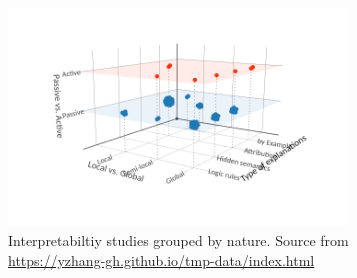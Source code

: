 \begin{figure}[H]
    \centering
    \includegraphics[width=0.8\textwidth]{fig/rel/images/ZhangsInterpspace.png}
    \caption{Interpretabiltiy studies grouped by nature. Source from \url{https://yzhang-gh.github.io/tmp-data/index.html}}
    \label{fig:rel_zhangs}
\end{figure}